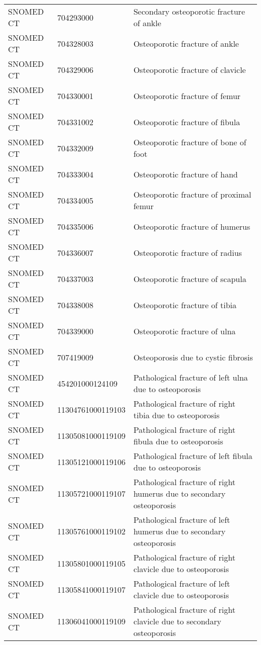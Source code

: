 \begin{longtable}{p{}p{}p{}}
  SNOMED CT & 704293000 & Secondary osteoporotic fracture of ankle \\ 
  SNOMED CT & 704328003 & Osteoporotic fracture of ankle \\ 
  SNOMED CT & 704329006 & Osteoporotic fracture of clavicle \\ 
  SNOMED CT & 704330001 & Osteoporotic fracture of femur \\ 
  SNOMED CT & 704331002 & Osteoporotic fracture of fibula \\ 
  SNOMED CT & 704332009 & Osteoporotic fracture of bone of foot \\ 
  SNOMED CT & 704333004 & Osteoporotic fracture of hand \\ 
  SNOMED CT & 704334005 & Osteoporotic fracture of proximal femur \\ 
  SNOMED CT & 704335006 & Osteoporotic fracture of humerus \\ 
  SNOMED CT & 704336007 & Osteoporotic fracture of radius \\ 
  SNOMED CT & 704337003 & Osteoporotic fracture of scapula \\ 
  SNOMED CT & 704338008 & Osteoporotic fracture of tibia \\ 
  SNOMED CT & 704339000 & Osteoporotic fracture of ulna \\ 
  SNOMED CT & 707419009 & Osteoporosis due to cystic fibrosis \\ 
  SNOMED CT & 454201000124109 & Pathological fracture of left ulna due to osteoporosis \\ 
  SNOMED CT & 11304761000119103 & Pathological fracture of right tibia due to osteoporosis \\ 
  SNOMED CT & 11305081000119109 & Pathological fracture of right fibula due to osteoporosis \\ 
  SNOMED CT & 11305121000119106 & Pathological fracture of left fibula due to osteoporosis \\ 
  SNOMED CT & 11305721000119107 & Pathological fracture of right humerus due to secondary osteoporosis \\ 
  SNOMED CT & 11305761000119102 & Pathological fracture of left humerus due to secondary osteoporosis \\ 
  SNOMED CT & 11305801000119105 & Pathological fracture of right clavicle due to osteoporosis \\ 
  SNOMED CT & 11305841000119107 & Pathological fracture of left clavicle due to osteoporosis \\ 
  SNOMED CT & 11306041000119109 & Pathological fracture of right clavicle due to secondary osteoporosis \\ 

\end{longtable}
